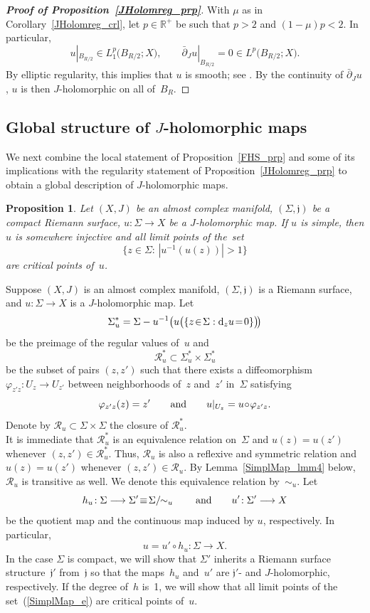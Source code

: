 \documentclass[11pt]{article}
\numberwithin{equation}{section}
\newtheorem{prp}[thm]{Proposition}
\theoremstyle{definition}
\def\BE#1{\begin{equation}\label{#1}}
\def\EE{\end{equation}}
\def\eref#1{(\ref{#1})}
\def\lra{\longrightarrow}
\def\fj{\mathfrak j}
\def\R{\mathbb R}
\def\cR{\mathcal R}
\def\vph{\varphi}
\def\Si{\Sigma}
\def\dbar{\bar\partial}
\def\nd{\textnormal{d}}
\begin{document}
\begin{proof}[{\bf\emph{Proof of Proposition~\ref{JHolomreg_prp}}}]
With $\mu$ as in Corollary~\ref{JHolomreg_crl}, let $p\!\in\!\R^+$ be such that 
$p\!>\!2$ and $(1\!-\!\mu)p\!<\!2$.
In particular, 
$$u|_{B_{R/2}}\in L^p_1\big(B_{R/2};X\big), \qquad
\dbar_Ju|_{B_{R/2}}=0\in L^p\big(B_{R/2};X\big).$$
By elliptic regularity, this implies that $u$ is smooth; see 
\cite[Theorem~B.4.1]{MS12}.
By the continuity of $\dbar_Ju$, $u$ is then $J$-holomorphic on all of~$B_R$.
\end{proof}



\subsection{Global structure of $J$-holomorphic maps}
\label{GlobStr_subs}

\noindent
We next combine the local statement of Proposition~\ref{FHS_prp}
and some of its implications with the regularity statement of
Proposition~\ref{JHolomreg_prp} to obtain a global description of 
$J$-holomorphic maps.

\begin{prp}\label{SimplMap_prp}
Let $(X,J)$ be an almost complex manifold, $(\Si,\fj)$ 
be a compact Riemann surface, $u\!:\Si\!\lra\!X$ be a $J$-holomorphic map.
If $u$ is simple, then $u$ is somewhere injective and all limit points
of the~set 
\BE{SimplMap_e}\big\{z\!\in\!\Si\!:\,|u^{-1}(u(z))|\!>\!1\big\}\EE
are critical points of~$u$.
\end{prp}

\noindent
Suppose $(X,J)$ is an almost complex manifold, 
$(\Si,\fj)$ is a Riemann surface, and $u\!:\Si\!\lra\!X$ is a $J$-holomorphic map.
Let 
\BE{Siudfn_e}\Si_u^*=\Si-u^{-1}\big(u\big(\{z\!\in\!\Si:\nd_zu\!=\!0\}\big)\!\big)\EE
be the preimage of the regular values of~$u$ and 
$$\cR_u^*\subset \Si_u^*\!\times\!\Si_u^*$$
be the subset of pairs $(z,z')$ such that there exists a diffeomorphism
$\vph_{z'z}\!:U_z\!\lra\!U_{z'}$ between neighborhoods of~$z$ and~$z'$ in~$\Si$
satisfying 
\BE{vphcond_e}\vph_{z'z}(z)=z' \qquad\hbox{and}\qquad u|_{U_z}=u\!\circ\!\vph_{z'z}.\EE
Denote by $\cR_u\!\subset\!\Si\!\times\!\Si$ the closure of $\cR_u^*$.\\

\noindent
It is immediate that $\cR_u^*$ is an equivalence relation on~$\Si$ and 
$u(z)\!=\!u(z')$ whenever $(z,z')\!\in\!\cR_u^*$.
Thus, $\cR_u$ is also a reflexive and symmetric relation and
 $u(z)\!=\!u(z')$ whenever $(z,z')\!\in\!\cR_u$.
By Lemma~\ref{SimplMap_lmm4} below, $\cR_u$ is transitive as well.
We denote this equivalence relation by~$\sim_u$.
Let
\BE{SimplMap_e2}h_u\!:\Si\lra\Si'\!\equiv\!\Si/\!\!\sim_u \qquad\hbox{and}\qquad
u'\!:\Si'\lra X\EE
be the quotient map and the continuous map induced by $u$, respectively.
In particular,
$$u\!=\!u'\!\circ\!h_u\!:\Si\lra X.$$
In the case $\Si$ is compact, we will show that $\Si'$ inherits a Riemann surface structure~$\fj'$
from~$\fj$ so that the maps~$h_u$ and~$u'$ are $\fj'$- and $J$-holomorphic, respectively.
If the degree of~$h$ is~1, we will show that all limit points of 
the set~\eref{SimplMap_e} are critical points of~$u$. 
\end{document}
